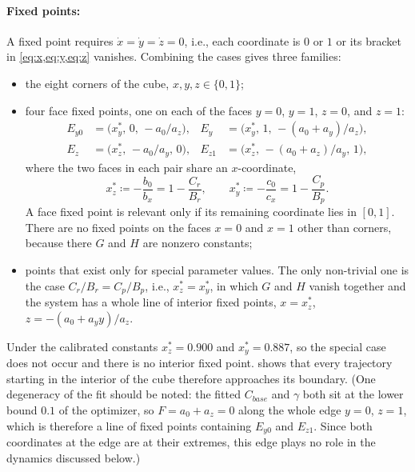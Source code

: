 \documentclass[10pt]{article}
\begin{document}
\paragraph{Fixed points:} A fixed point requires $\dot x=\dot y=\dot z=0$, i.e., each coordinate is $0$ or $1$ or its bracket in \cref{eq:x,eq:y,eq:z} vanishes. Combining the cases gives three families:
\begin{itemize}
\item the eight corners of the cube, $x,y,z\in\{0,1\}$;
\item four face fixed points, one on each of the faces $y=0$, $y=1$, $z=0$, and $z=1$:
\begin{equation}
\begin{aligned}
E_{y0} &= \big(x_y^*,\,0,\,-a_0/a_z\big), & E_y &= \big(x_y^*,\,1,\,-(a_0+a_y)/a_z\big),\\
E_z &= \big(x_z^*,\,-a_0/a_y,\,0\big), & E_{z1} &= \big(x_z^*,\,-(a_0+a_z)/a_y,\,1\big),
\end{aligned}
\label{eq:facefp}
\end{equation}
where the two faces in each pair share an $x$-coordinate,
\begin{equation}
x_z^* \coloneqq -\frac{b_0}{b_x} = 1-\frac{C_r}{B_r},\qquad x_y^* \coloneqq -\frac{c_0}{c_x}=1-\frac{C_p}{B_p}.
\label{eq:xstar}
\end{equation}
A face fixed point is relevant only if its remaining coordinate lies in $[0,1]$. There are no fixed points on the faces $x=0$ and $x=1$ other than corners, because there $G$ and $H$ are nonzero constants;
\item points that exist only for special parameter values. The only non-trivial one is the case $C_r/B_r=C_p/B_p$, i.e., $x_z^*=x_y^*$, in which $G$ and $H$ vanish together and the system has a whole line of interior fixed points, $x=x_z^*$, $z=-(a_0+a_y y)/a_z$.
\end{itemize}
Under the calibrated constants $x_z^*=0.900$ and $x_y^*=0.887$, so the special case does not occur and there is no interior fixed point.  shows that every trajectory starting in the interior of the cube therefore approaches its boundary. (One degeneracy of the fit should be noted: the fitted $C_{base}$ and $\gamma$ both sit at the lower bound $0.1$ of the optimizer, so $F=a_0+a_z=0$ along the whole edge $y=0$, $z=1$, which is therefore a line of fixed points containing $E_{y0}$ and $E_{z1}$. Since both coordinates at the edge are at their extremes, this edge plays no role in the dynamics discussed below.)
\end{document}
